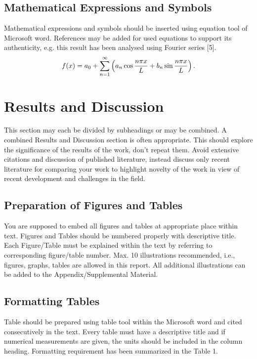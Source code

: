 \documentclass[11pt,twocolumn]{article}
\begin{document}
\subsection{Mathematical Expressions and Symbols}
Mathematical expressions and symbols should be inserted using equation tool of Microsoft word. References may be added for used equations to support its authenticity, e.g. this result has been analysed using Fourier series [5].
\begin{equation}
f(x) = a_0 + \sum_{n=1}^\infty \left( a_n \cos {n\pi x\over L} + b_n \sin {n\pi x \over L} \right).
\end{equation}

\section{Results and Discussion}
This section may each be divided by subheadings or may be combined.  A combined Results and Discussion section is often appropriate.  This should explore the significance of the results of the work, don’t repeat them. Avoid extensive citations and discussion of published literature, instead discuss only recent literature for comparing your work to highlight novelty of the work in view of recent development and challenges in the field.

\subsection{Preparation of Figures and Tables}
You are supposed to embed all figures and tables at appropriate place within text. Figures and Tables should be numbered properly with descriptive title. Each Figure/Table must be explained within the text by referring to corresponding figure/table number. Max. 10 illustrations recommended, i.e., figures, graphs, tables are allowed in this report. All additional illustrations can be added to the Appendix/Supplemental Material.

\subsection{Formatting Tables}
Table should be prepared using table tool within the Microsoft word and cited consecutively in the text. Every table must have a descriptive title and if numerical measurements are given, the units should be included in the column heading. Formatting requirement has been summarized in the Table 1.
\end{document}
